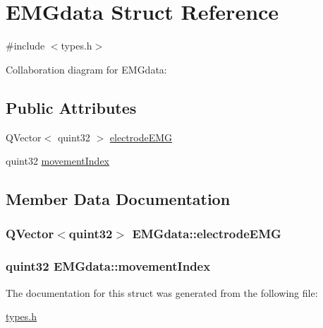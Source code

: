 \hypertarget{structEMGdata}{}\section{E\+M\+Gdata Struct Reference}
\label{structEMGdata}


{\ttfamily \#include $<$types.\+h$>$}



Collaboration diagram for E\+M\+Gdata\+:
\subsection*{Public Attributes}
\begin{DoxyCompactItemize}
\item 
Q\+Vector$<$ quint32 $>$ \hyperlink{structEMGdata_a5aede321762b5fb32b3ee8ac820459fe}{electrode\+E\+M\+G}
\item 
quint32 \hyperlink{structEMGdata_abb8fe3dd0b86828158a28e610283847a}{movement\+Index}
\end{DoxyCompactItemize}


\subsection{Member Data Documentation}
\hypertarget{structEMGdata_a5aede321762b5fb32b3ee8ac820459fe}{}
\subsubsection[{electrode\+E\+M\+G}]{\setlength{\rightskip}{0pt plus 5cm}Q\+Vector$<$quint32$>$ E\+M\+Gdata\+::electrode\+E\+M\+G}\label{structEMGdata_a5aede321762b5fb32b3ee8ac820459fe}
\hypertarget{structEMGdata_abb8fe3dd0b86828158a28e610283847a}{}
\subsubsection[{movement\+Index}]{\setlength{\rightskip}{0pt plus 5cm}quint32 E\+M\+Gdata\+::movement\+Index}\label{structEMGdata_abb8fe3dd0b86828158a28e610283847a}


The documentation for this struct was generated from the following file\+:\begin{DoxyCompactItemize}
\item 
\hyperlink{types_8h}{types.\+h}\end{DoxyCompactItemize}

